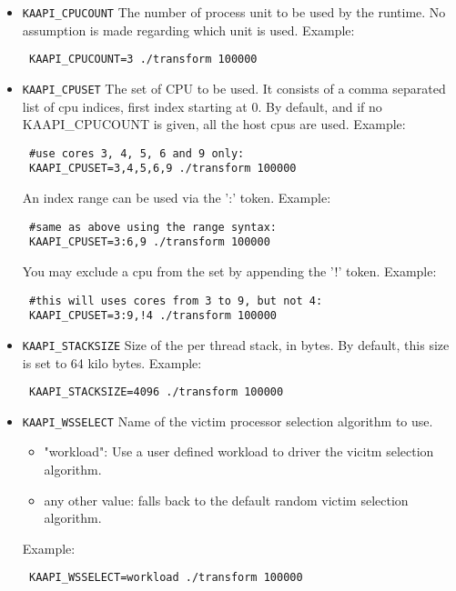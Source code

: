 \begin{itemize} %

\item \verb+KAAPI_CPUCOUNT+\newline
The number of process unit to be used by the runtime.
No assumption is made regarding which unit is used.
Example:
\begin{verbatim}
 KAAPI_CPUCOUNT=3 ./transform 100000
\end{verbatim}

\item \verb+KAAPI_CPUSET+\newline
The set of CPU to be used. It consists of a comma
separated list of cpu indices, first index starting
at 0. By default, and if no KAAPI\_CPUCOUNT is given,
all the host cpus are used.
Example:
\begin{verbatim}
 #use cores 3, 4, 5, 6 and 9 only:
 KAAPI_CPUSET=3,4,5,6,9 ./transform 100000
\end{verbatim}

An index range can be used via the ':' token.
Example:
\begin{verbatim}
 #same as above using the range syntax:
 KAAPI_CPUSET=3:6,9 ./transform 100000
\end{verbatim}

You may exclude a cpu from the set by appending the '!' token.
Example:
\begin{verbatim}
 #this will uses cores from 3 to 9, but not 4:
 KAAPI_CPUSET=3:9,!4 ./transform 100000
\end{verbatim}

\item \verb+KAAPI_STACKSIZE+\newline
Size of the per thread stack, in bytes. By default, this size
is set to 64 kilo bytes.
Example:
\begin{verbatim}
 KAAPI_STACKSIZE=4096 ./transform 100000
\end{verbatim}

\item \verb+KAAPI_WSSELECT+\newline
Name of the victim processor selection algorithm to use.
\begin{itemize}
\item "workload":
Use a user defined workload to driver the vicitm selection algorithm.
\item any other value: falls back to the default random victim selection
algorithm.
\end{itemize}
Example:
\begin{verbatim}
 KAAPI_WSSELECT=workload ./transform 100000
\end{verbatim}
\end{itemize} %

